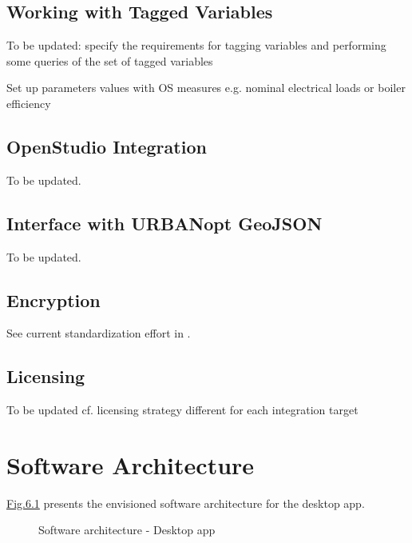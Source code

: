 \documentclass[letterpaper,10pt, openany,english]{sphinxmanual}
\begin{document}
\section{Working with Tagged Variables}
\label{\detokenize{requirements:working-with-tagged-variables}}\label{\detokenize{requirements:par-tagged-variables}}
To be updated: specify the requirements for tagging variables and performing some queries of the set of tagged variables

Set up parameters values with OS measures e.g. nominal electrical loads or boiler efficiency


\section{OpenStudio Integration}
\label{\detokenize{requirements:openstudio-integration}}
To be updated.


\section{Interface with URBANopt GeoJSON}
\label{\detokenize{requirements:interface-with-urbanopt-geojson}}
To be updated.


\section{Encryption}
\label{\detokenize{requirements:encryption}}
See current standardization effort in .


\section{Licensing}
\label{\detokenize{requirements:licensing}}
To be updated cf. licensing strategy different for each integration target


\chapter{Software Architecture}
\label{\detokenize{architecture:software-architecture}}\label{\detokenize{architecture:sec-architecture}}\label{\detokenize{architecture::doc}}
\hyperref[\detokenize{architecture:linkage-architecture-0}]{Fig.\@ \ref{\detokenize{architecture:linkage-architecture-0}}} presents the envisioned software architecture for the desktop app.

\begin{figure}[htbp]
\centering
\capstart

\noindent{}
\caption{Software architecture - Desktop app}\label{\detokenize{architecture:linkage-architecture-0}}\end{figure}
\end{document}
